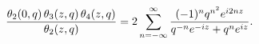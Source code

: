 \[\frac{\mathop{\theta_{2}\/}\nolimits\!\left(0,q\right)\mathop{\theta_{3}\/}%
\nolimits\!\left(z,q\right)\mathop{\theta_{4}\/}\nolimits\!\left(z,q\right)}{%
\mathop{\theta_{2}\/}\nolimits\!\left(z,q\right)}=2\sum_{n=-\infty}^{\infty}%
\frac{(-1)^{n}q^{n^{2}}e^{i2nz}}{q^{-n}e^{-iz}+q^{n}e^{iz}}.\]